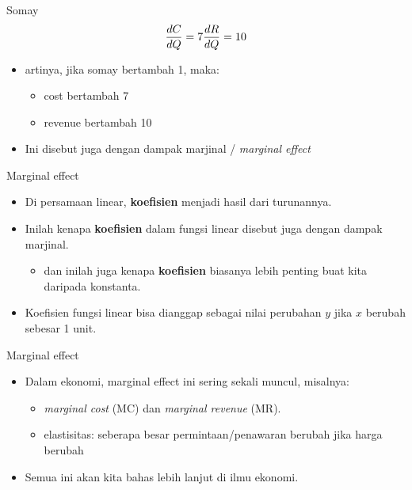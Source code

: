 \documentclass[
  ignorenonframetext,
]{beamer}
\providecommand{\tightlist}{%
  \setlength{\itemsep}{0pt}\setlength{\parskip}{0pt}}\usepackage{longtable,booktabs,array}
\begin{document}
\begin{frame}{Somay}
\label{somay-1}
\[
\frac{dC}{dQ}=7 \\
\frac{dR}{dQ}=10
\]

\begin{itemize}
\item
  artinya, jika somay bertambah 1, maka:

  \begin{itemize}
  \item
    cost bertambah 7
  \item
    revenue bertambah 10
  \end{itemize}
\item
  Ini disebut juga dengan dampak marjinal / \emph{marginal effect}
\end{itemize}
\end{frame}

\begin{frame}{Marginal effect}
\label{marginal-effect}
\begin{itemize}
\item
  Di persamaan linear, \textbf{koefisien} menjadi hasil dari turunannya.
\item
  Inilah kenapa \textbf{koefisien} dalam fungsi linear disebut juga
  dengan dampak marjinal.

  \begin{itemize}
  \tightlist
  \item
    dan inilah juga kenapa \textbf{koefisien} biasanya lebih penting
    buat kita daripada konstanta.
  \end{itemize}
\item
  Koefisien fungsi linear bisa dianggap sebagai nilai perubahan \(y\)
  jika \(x\) berubah sebesar 1 unit.
\end{itemize}
\end{frame}

\begin{frame}{Marginal effect}
\label{marginal-effect-1}
\begin{itemize}
\item
  Dalam ekonomi, marginal effect ini sering sekali muncul, misalnya:

  \begin{itemize}
  \item
    \emph{marginal cost} (MC) dan \emph{marginal revenue} (MR).
  \item
    elastisitas: seberapa besar permintaan/penawaran berubah jika harga
    berubah
  \end{itemize}
\item
  Semua ini akan kita bahas lebih lanjut di ilmu ekonomi.
\end{itemize}
\end{frame}
\end{document}
